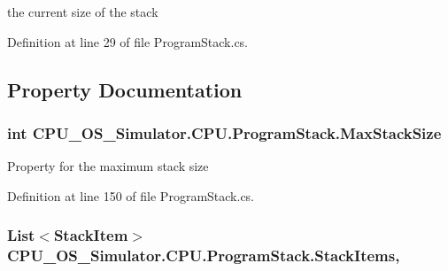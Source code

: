 the current size of the stack 



Definition at line 29 of file Program\+Stack.\+cs.



\subsection{Property Documentation}
\hypertarget{class_c_p_u___o_s___simulator_1_1_c_p_u_1_1_program_stack_a5ed770e83658cfcde6e451c27342dca3}{}
\subsubsection[{Max\+Stack\+Size}]{\setlength{\rightskip}{0pt plus 5cm}int C\+P\+U\+\_\+\+O\+S\+\_\+\+Simulator.\+C\+P\+U.\+Program\+Stack.\+Max\+Stack\+Size\hspace{0.3cm}{\ttfamily [get]}}\label{class_c_p_u___o_s___simulator_1_1_c_p_u_1_1_program_stack_a5ed770e83658cfcde6e451c27342dca3}


Property for the maximum stack size 



Definition at line 150 of file Program\+Stack.\+cs.

\hypertarget{class_c_p_u___o_s___simulator_1_1_c_p_u_1_1_program_stack_a13eb0a485bbcdba8a38bbf80e78692c7}{}
\subsubsection[{Stack\+Items}]{\setlength{\rightskip}{0pt plus 5cm}List$<${\bf Stack\+Item}$>$ C\+P\+U\+\_\+\+O\+S\+\_\+\+Simulator.\+C\+P\+U.\+Program\+Stack.\+Stack\+Items\hspace{0.3cm}{\ttfamily [get]}, {\ttfamily [set]}}\label{class_c_p_u___o_s___simulator_1_1_c_p_u_1_1_program_stack_a13eb0a485bbcdba8a38bbf80e78692c7}


